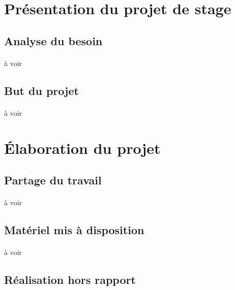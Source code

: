 \documentclass[a4paper,12pt]{extarticle}
\begin{document}
\clearpage

\section{Présentation du projet de stage}

\subsection{Analyse du besoin}

\paragraph{}
à voir\\

\subsection{But du projet}

\paragraph{}
à voir\\

\clearpage

\section{Élaboration du projet}

\subsection{Partage du travail}

\paragraph{}
à voir\\

\subsection{Matériel mis à disposition}

\paragraph{}
à voir\\

\subsection{Réalisation hors rapport}
\end{document}
